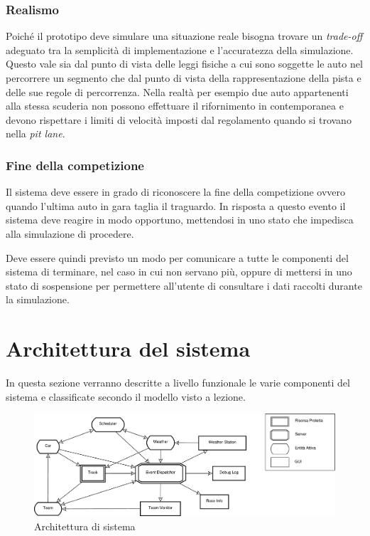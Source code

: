\documentclass[11pt,a4paper]{report}
\begin{document}
\subsection*{Realismo}
Poiché il prototipo deve simulare una situazione reale bisogna trovare un \textit{trade-off} adeguato tra la semplicità di implementazione e l'accuratezza della simulazione. Questo vale sia dal punto di vista delle leggi fisiche a cui sono soggette le auto nel percorrere un segmento che dal punto di vista della rappresentazione della pista e delle sue regole di percorrenza. Nella realtà per esempio due auto appartenenti alla stessa scuderia non possono effettuare il rifornimento in contemporanea e devono rispettare i limiti di velocità imposti dal regolamento quando si trovano nella \textit{pit lane}.

\subsection*{Fine della competizione}
Il sistema deve essere in grado di riconoscere la fine della competizione ovvero quando l'ultima auto in gara taglia il traguardo. In risposta a questo evento il sistema deve reagire in modo opportuno, mettendosi in uno stato che impedisca alla simulazione di procedere.

Deve essere quindi previsto un modo per comunicare a tutte le componenti del sistema di terminare, nel caso in cui non servano più, oppure di mettersi in uno stato di sospensione per permettere all'utente di consultare i dati raccolti durante la simulazione.


\chapter{Architettura del sistema}
In questa sezione verranno descritte a livello funzionale le varie componenti del sistema e classificate secondo il modello visto a lezione.

\begin{landscape}
\begin{figure}
\includegraphics[height=.25\paperheight]{diagrammi/Arch}
\caption{Architettura di sistema}
\label{fig:architettura}
\end{figure}
\end{landscape}
\end{document}
